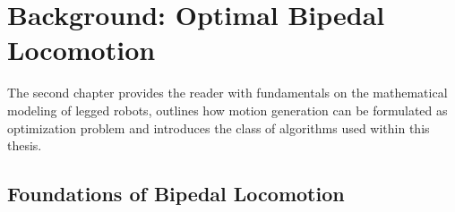 
\chapter{Background: Optimal Bipedal Locomotion}\label{c2}
The second chapter provides the reader with fundamentals on the mathematical modeling of legged robots, outlines how motion generation can be formulated as optimization problem and introduces the class of algorithms used within this thesis. 

\section{Foundations of Bipedal Locomotion}
